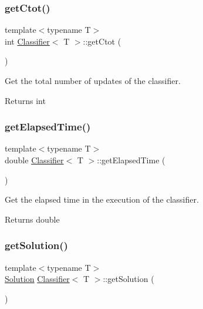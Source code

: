 \mbox{\label{class_classifier_aefd89af30ccd3e38194946bacecdf82a}} 
\subsubsection{\texorpdfstring{get\+Ctot()}{getCtot()}}
{\footnotesize\ttfamily template$<$typename T$>$ \\
int \mbox{\hyperlink{class_classifier}{Classifier}}$<$ T $>$\+::get\+Ctot (\begin{DoxyParamCaption}{ }\end{DoxyParamCaption})\hspace{0.3cm}{\ttfamily [inline]}}



Get the total number of updates of the classifier. 

\begin{DoxyReturn}{Returns}
int 
\end{DoxyReturn}
\mbox{\label{class_classifier_abbed7a8ea8050ae19a2c4c5f4a5e6002}} 
\subsubsection{\texorpdfstring{get\+Elapsed\+Time()}{getElapsedTime()}}
{\footnotesize\ttfamily template$<$typename T$>$ \\
double \mbox{\hyperlink{class_classifier}{Classifier}}$<$ T $>$\+::get\+Elapsed\+Time (\begin{DoxyParamCaption}{ }\end{DoxyParamCaption})\hspace{0.3cm}{\ttfamily [inline]}}



Get the elapsed time in the execution of the classifier. 

\begin{DoxyReturn}{Returns}
double 
\end{DoxyReturn}
\mbox{\label{class_classifier_a225887f545e5ad0a2bb414f969771cca}} 
\subsubsection{\texorpdfstring{get\+Solution()}{getSolution()}}
{\footnotesize\ttfamily template$<$typename T$>$ \\
\mbox{\hyperlink{class_solution}{Solution}} \mbox{\hyperlink{class_classifier}{Classifier}}$<$ T $>$\+::get\+Solution (\begin{DoxyParamCaption}{ }\end{DoxyParamCaption})\hspace{0.3cm}{\ttfamily [inline]}}



